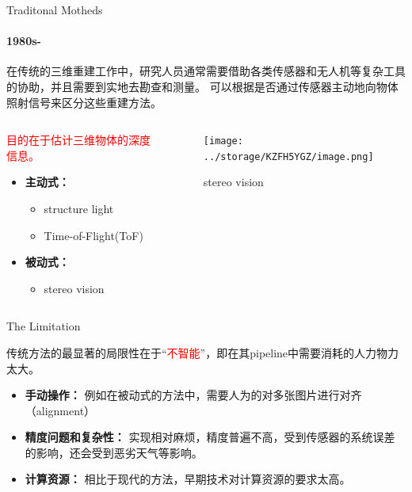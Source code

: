 \documentclass[dark]{sintefbeamer}
\begin{document}
\begin{frame}[fragile]{Traditonal Motheds}{\thesection \, \secname}
  \framesubtitle{1980s-}

  在传统的三维重建工作中，研究人员通常需要借助各类传感器和无人机等复杂工具的协助，并且需要到实地去勘查和测量。
  可以根据是否通过传感器主动地向物体照射信号来区分这些重建方法。

  \begin{columns}
    \begin{column}{0.6\textwidth}
      \textcolor{red}{目的在于估计三维物体的深度信息。}
      \begin{itemize}
        \item \textbf{主动式：}
          \begin{itemize}
            \item structure light\cite{gengStructuredlight3DSurface2011}
            \item Time-of-Flight(ToF)
          \end{itemize}
          
        \item \textbf{被动式：}
          \begin{itemize}
            \item stereo vision\cite{hamzahLiteratureSurveyStereo2016}
          \end{itemize}
      \end{itemize}
    \end{column}
    \begin{column}{0.4\textwidth}
      \begin{figure}
        \texttt{[image: ../storage/KZFH5YGZ/image.png]}
        \caption{stereo vision}
      \end{figure}
      
    \end{column}
  \end{columns}

\end{frame}

\begin{frame}{The Limitation}

传统方法的最显著的局限性在于“\textcolor{red}{不智能}”，即在其pipeline中需要消耗的人力物力太大。

\begin{itemize}
  \item \textbf{手动操作：} 例如在被动式的方法中，需要人为的对多张图片进行对齐（alignment）
  \item \textbf{精度问题和复杂性：} 实现相对麻烦，精度普遍不高，受到传感器的系统误差的影响，还会受到恶劣天气等影响。
  \item \textbf{计算资源：} 相比于现代的方法，早期技术对计算资源的要求太高。
\end{itemize}

\end{frame}
\end{document}
